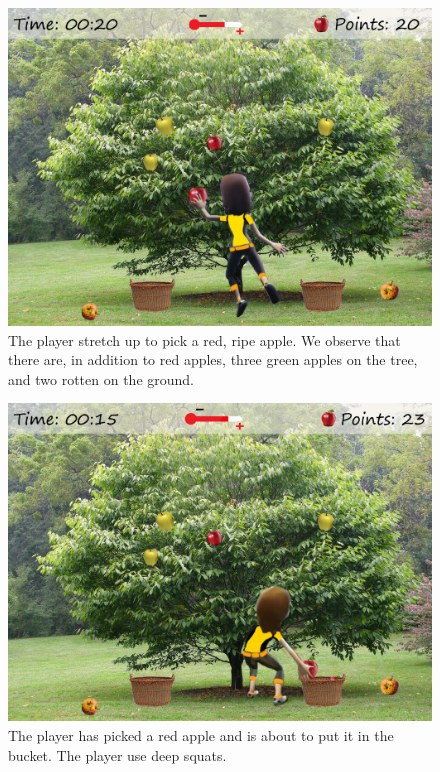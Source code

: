 \begin{figure} [H]
\centering
\includegraphics[scale=0.1]{gameappletreeEng.jpg}
\caption[Picking apples - stretching]{The player stretch up to pick a red, ripe apple. We observe that there are, in addition to red apples, three green apples on the tree, and two rotten on the ground.}
\label{fig:appleStretch}
\end{figure}

\begin{figure} [H]
\centering
\includegraphics[scale=0.1]{squatppletreeEng.jpg}
\caption[Picking apples - squats]{The player has picked a red apple and is about to put it in the bucket. The player use deep squats.}
\label{fig:appleSquat}
\end{figure}

